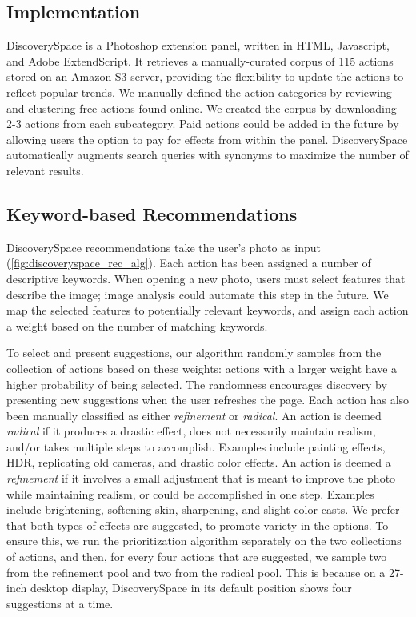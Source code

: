 \subsection{Implementation}
Discovery\-Space is a Photoshop extension panel, written in HTML, Javascript, and Adobe ExtendScript. It retrieves a manually-curated corpus of 115 actions stored on an Amazon S3 server, providing the flexibility to update the actions to reflect popular trends. We manually defined the action categories by reviewing and clustering free actions found online. We created the corpus by downloading 2-3 actions from each subcategory. Paid actions could be added in the future by allowing users the option to pay for effects from within the panel. Discovery\-Space automatically augments search queries with synonyms to maximize the number of relevant results.

\subsection{Keyword-based Recommendations}
Discovery\-Space recommendations take the user's photo as input (\autoref{fig:discoveryspace_rec_alg}). Each action has been assigned a number of descriptive keywords. When opening a new photo, users must select features that describe the image; image analysis could automate this step in the future. We map the selected features to potentially relevant keywords, and assign each action a weight based on the number of matching keywords.

To select and present suggestions, our algorithm randomly samples from the collection of actions based on these weights: actions with a larger weight have a higher probability of being selected. The randomness encourages discovery by presenting new suggestions when the user refreshes the page. Each action has also been manually classified as either \textit{refinement} or \textit{radical}. An action is deemed \textit{radical} if it produces a drastic effect, does not necessarily maintain realism, and/or takes multiple steps to accomplish. Examples include painting effects, HDR, replicating old cameras, and drastic color effects. An action is deemed a \textit{refinement} if it involves a small adjustment that is meant to improve the photo while maintaining realism, or could be accomplished in one step. Examples include brightening, softening skin, sharpening, and slight color casts. We prefer that both types of effects are suggested, to promote variety in the options. To ensure this, we run the prioritization algorithm separately on the two collections of actions, and then, for every four actions that are suggested, we sample two from the refinement pool and two from the radical pool. This is because on a 27-inch desktop display, Discovery\-Space in its default position shows four suggestions at a time.

